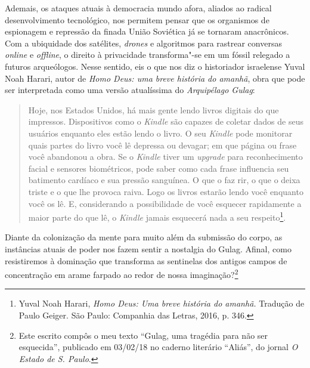 Ademais, os ataques atuais à democracia mundo afora, aliados ao radical
desenvolvimento tecnológico, nos permitem pensar que os organismos de
espionagem e repressão da finada União Soviética já se tornaram
anacrônicos. Com a ubiquidade dos satélites, \emph{drones} e algoritmos
para rastrear conversas \emph{online} e \emph{offline}, o direito à
privacidade transforma"-se em um fóssil relegado a futuros arqueólogos.
Nesse sentido, eis o que nos diz o historiador israelense Yuval Noah
Harari, autor de \emph{Homo Deus: uma breve história do amanhã}, obra
que pode ser interpretada como uma versão atualíssima do
\emph{Arquipélago Gulag}:

\begin{quote}
Hoje, nos Estados Unidos, há mais gente lendo livros digitais do que
impressos. Dispositivos como o \emph{Kindle} são capazes de coletar
dados de seus usuários enquanto eles estão lendo o livro. O seu
\emph{Kindle} pode monitorar quais partes do livro você lê depressa ou
devagar; em que página ou frase você abandonou a obra. Se o
\emph{Kindle} tiver um \emph{upgrade} para reconhecimento facial e
sensores biométricos, pode saber como cada frase influencia seu
batimento cardíaco e sua pressão sanguínea. O que o faz rir, o que o
deixa triste e o que lhe provoca raiva. Logo os livros estarão lendo
você enquanto você os lê. E, considerando a possibilidade de você
esquecer rapidamente a maior parte do que lê, o \emph{Kindle} jamais
esquecerá nada a seu respeito\footnote{Yuval Noah Harari, \emph{Homo
  Deus: Uma breve história do amanhã.} Tradução de Paulo Geiger. São
  Paulo: Companhia das Letras, 2016, p. 346.}.
\end{quote}

\pagebreak

Diante da colonização da mente para muito além da submissão do corpo, as
instâncias atuais de poder nos fazem sentir a nostalgia do Gulag.
Afinal, como resistiremos à dominação que transforma as sentinelas dos
antigos campos de concentração em arame farpado ao redor de nossa
imaginação?\footnote{Este escrito compôs o meu texto ``Gulag, uma
  tragédia para não ser esquecida'', publicado em 03/02/18 no caderno
  literário ``Aliás'', do jornal \emph{O Estado de S. Paulo}.}


